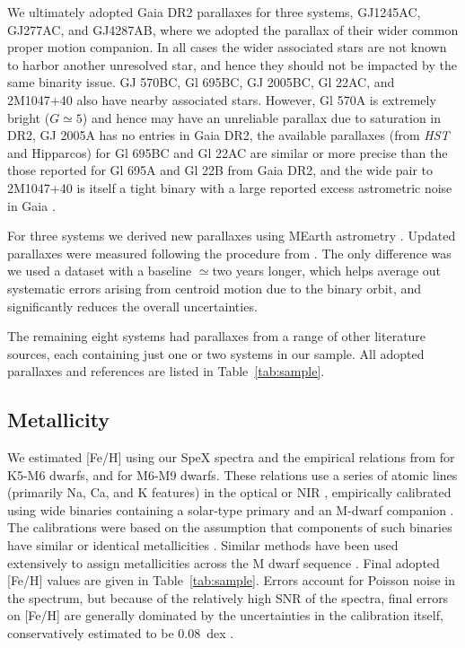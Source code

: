 \documentclass[twocolumn]{aastex62}
\begin{document}
We ultimately adopted Gaia DR2 parallaxes for three systems, GJ1245AC, GJ277AC, and GJ4287AB, where we adopted the parallax of their wider common proper motion companion. In all cases the wider associated stars are not known to harbor another unresolved star, and hence they should not be impacted by the same binarity issue. GJ 570BC, Gl 695BC, GJ 2005BC, Gl 22AC, and 2M1047+40 also have nearby associated stars. However, Gl 570A is extremely bright ($G\simeq5$) and hence may have an unreliable parallax due to saturation in DR2, GJ 2005A has no entries in Gaia DR2, the available parallaxes (from {\it HST} and Hipparcos) for Gl 695BC and Gl 22AC are similar or more precise than the those reported for Gl 695A and Gl 22B from Gaia DR2, and the wide pair to 2M1047+40 is itself a tight binary \citep[LP 213-67AB,][]{Dupuy2017} with a large reported excess astrometric noise in Gaia \citep[a sign of binarity,][]{2018RNAAS...2...20E}.

For three systems we derived new parallaxes using MEarth astrometry \citep{Nutzman:2008gf}. Updated parallaxes were measured following the procedure from \citet{2014ApJ...784..156D}. The only difference was we used a dataset with a baseline $\simeq$two years longer, which helps average out systematic errors arising from centroid motion due to the binary orbit, and significantly reduces the overall uncertainties. 

The remaining eight systems had parallaxes from a range of other literature sources, each containing just one or two systems in our sample. All adopted parallaxes and references are listed in Table~\ref{tab:sample}.

\subsection{Metallicity}\label{sec:feh}

We estimated [Fe/H] using our SpeX spectra and the empirical relations from \citet{Mann2013a} for K5-M6 dwarfs, and \citet{Mann2014} for M6-M9 dwarfs. These relations use a series of atomic lines (primarily Na, Ca, and K features) in the optical or NIR \citep[e.g.,][]{2010ApJ...720L.113R,Terrien:2012lr}, empirically calibrated using wide binaries containing a solar-type primary and an M-dwarf companion \citep[e.g.,][]{2005A&A...442..635B,Johnson2009,Neves2012}. The calibrations were based on the assumption that components of such binaries have similar or identical metallicities \citep[e.g.,][]{2015ApJ...801L..10T}. Similar methods have been used extensively to assign metallicities across the M dwarf sequence \citep[e.g.,][]{Terrien2015,Muirhead2015,Dressing2017,2018ApJ...853...30V,2018ApJ...854..145M}. Final adopted [Fe/H] values are given in Table~\ref{tab:sample}. Errors account for Poisson noise in the spectrum, but because of the relatively high SNR of the spectra, final errors on [Fe/H] are generally dominated by the uncertainties in the calibration itself, conservatively estimated to be 0.08~dex \citep{Mann2013a,Mann2014}.
\end{document}
